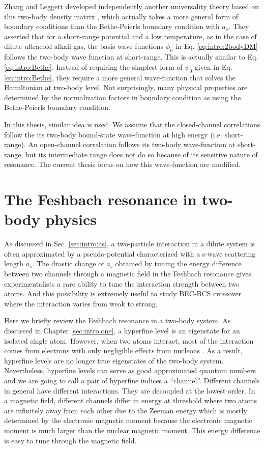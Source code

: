 Zhang and Leggett developed independently another universality theory based on this two-body density matrix \linebreak[2] \cite{shizhongUniv}, which actually takes a more general form of boundary conditions than the Bethe-Peierls boundary condition with $a_{s}$.   They asserted that for a short-range potential and a low temperature, as in the case of  dilute ultracold alkali gas, the basis wave functions $\phi_n$  in Eq. \eqref{eq:intro:2bodyDM} follows the two-body wave function at short-range. This is actually similar to Eq. \eqref{eq:intro:Bethe}.  Instead of requiring the simplest form of $\psi_0$ given in Eq. \eqref{eq:intro:Bethe}, they require a more general wave-function that solves the  Hamiltonian at two-body level.  Not surprisingly, many physical properties are determined by the normalization factors in boundary condition as using the Bethe-Peierls boundary condition.  

In this thesis, similar idea is used.  We assume that the closed-channel correlations follow the its two-body bound-state wave-function at high energy (i.e. short-range).   An open-channel correlation follows its two-body  wave-function at short-range, but its intermediate range does not do so because of its sensitive nature of resonance.   The current thesis focus on how this wave-function are modified. 
 
 
 \chapter{The  Feshbach resonance in two-body physics\label{sec:intro:twobody}}
 As discussed in Sec. \ref{sec:intro:as}, a two-particle interaction in a dilute system is often approximated by a pseudo-potential characterized with a s-wave scattering length $a_{s}$.   The drastic  change  of $a_{s}$  obtained by tuning the energy difference  between two channels  through a magnetic field in the Feshbach resonance gives  experimentalists a rare ability to tune the interaction strength between two atoms.  And this possibility is extremely useful to study BEC-BCS crossover where the interaction varies from weak to strong.  
 
Here we briefly review the Feshbach resonance in a two-body system.   As discussed in Chapter \ref{sec:intro:one}, a hyperfine level is an eigenstate for an isolated single atom.  However, when two atoms interact, most of the interaction comes from  electrons with only negligible effects from nucleons .  As a result, hyperfine levels are no longer true eigenstates of the two-body system.  Nevertheless, hyperfine levels can serve as  good approximated quantum numbers and we are going to call a pair of hyperfine indices a ``channel''.  Different channels in general have different  interactions.  They are decoupled at the lowest order.  In a magnetic field, different channels differ in energy at threshold where two atoms are infinitely away from each other due to the Zeeman energy which is mostly determined by the electronic magnetic moment because  the electronic magnetic moment is much larger than the nuclear magnetic moment.  This energy difference is easy to tune through the magnetic field.  

